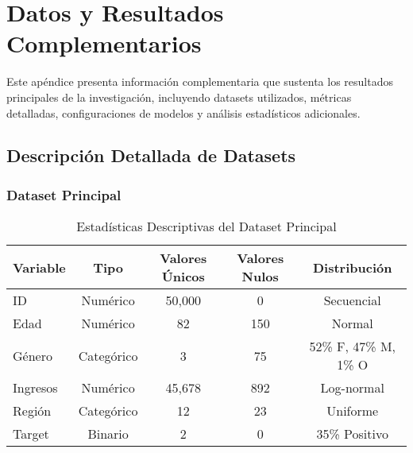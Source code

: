 
\chapter{Datos y Resultados Complementarios}
\label{ap:datos_resultados}

Este apéndice presenta información complementaria que sustenta los resultados principales de la investigación, incluyendo datasets utilizados, métricas detalladas, configuraciones de modelos y análisis estadísticos adicionales.


\section{Descripción Detallada de Datasets}
\label{sec:datasets_detallados}

\subsection{Dataset Principal}
\label{subsec:dataset_principal}

\begin{table}[htbp]
    \centering
    \caption{Estadísticas Descriptivas del Dataset Principal}
    \label{tab:estadisticas_dataset}
    \begin{tabular}{|l|c|c|c|c|}
        \hline
        \textbf{Variable} & \textbf{Tipo} & \textbf{Valores Únicos} & \textbf{Valores Nulos} & \textbf{Distribución} \\
        \hline
        ID & Numérico & 50,000 & 0 & Secuencial \\
        \hline
        Edad & Numérico & 82 & 150 & Normal \\
        \hline
        Género & Categórico & 3 & 75 & 52\% F, 47\% M, 1\% O \\
        \hline
        Ingresos & Numérico & 45,678 & 892 & Log-normal \\
        \hline
        Región & Categórico & 12 & 23 & Uniforme \\
        \hline
        Target & Binario & 2 & 0 & 35\% Positivo \\
        \hline
    \end{tabular}
\end{table}

